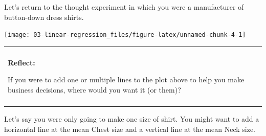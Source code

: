 \documentclass[
]{book}
\newenvironment{Shaded}{\begin{snugshade}}{\end{snugshade}}
\newcommand{\DataTypeTok}[1]{\textcolor[rgb]{0.13,0.29,0.53}{#1}}
\newcommand{\KeywordTok}[1]{\textcolor[rgb]{0.13,0.29,0.53}{\textbf{#1}}}
\newcommand{\NormalTok}[1]{#1}
\newcommand{\OperatorTok}[1]{\textcolor[rgb]{0.81,0.36,0.00}{\textbf{#1}}}
\newcommand{\StringTok}[1]{\textcolor[rgb]{0.31,0.60,0.02}{#1}}
\newenvironment{reflect}
{
    \begin{center}
    
    \begin{tabular}{|p{0.8\textwidth}|}
    \rowcolor{LightBlue}
    \hline\\
    \rowcolor{LightBlue}
    \textbf{Reflect:}
}
{
    \\\rowcolor{LightBlue}
    \\\hline
    \end{tabular} 
    \end{center}
}
\begin{document}
Let's return to the thought experiment in which you were a manufacturer of button-down dress shirts.

\begin{Shaded}
\end{Shaded}

\begin{center}\texttt{[image: 03-linear-regression\_files/figure-latex/unnamed-chunk-4-1]} \end{center}

\begin{reflect}
If you were to add one or multiple lines to the plot above to help you
make business decisions, where would you want it (or them)?
\end{reflect}

Let's say you were only going to make one size of shirt. You might want to add a horizontal line at the mean Chest size and a vertical line at the mean Neck size.

\begin{Shaded}
\end{Shaded}
\end{document}
